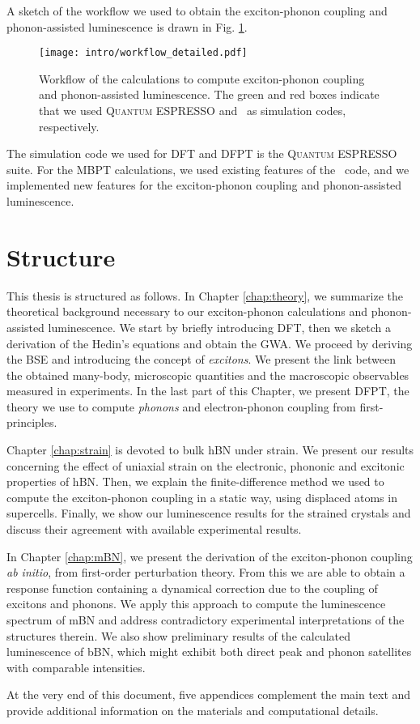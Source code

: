 A sketch of the workflow we used to obtain the exciton-phonon coupling and phonon-assisted luminescence is drawn in Fig. \ref{fig:workflow}.
\begin{figure}[t]
	\vspace{0.2cm}
	\setcapindent{2em}
	\centering
	\texttt{[image: intro/workflow\_detailed.pdf]}
	\caption{Workflow of the calculations to compute exciton-phonon coupling and phonon-assisted luminescence. The green and red boxes indicate that we used \textsc{Quantum ESPRESSO} and \yambo~as simulation codes, respectively.}
	\label{fig:workflow}
\end{figure}
The simulation code we used for \acrshort{DFT} and \acrshort{DFPT} is the \textsc{Quantum ESPRESSO} suite.\cite{giannozzi2009quantum,giannozzi2017advanced} For the \acrshort{MBPT} calculations, we used existing features of the \yambo~code,\cite{Sangalli_2019} and we implemented new features for the exciton-phonon coupling and phonon-assisted luminescence.

\section*{Structure}
This thesis is structured as follows. In Chapter \ref{chap:theory}, we summarize the theoretical background necessary to our exciton-phonon calculations and phonon-assisted luminescence. We start by briefly introducing \acrshort{DFT}, then we sketch a derivation of the Hedin's equations and obtain the \acrfull{GWA}. We proceed by deriving the \acrfull{BSE} and introducing the concept of \textit{excitons}. We present the link between the obtained many-body, microscopic quantities and the macroscopic observables measured in experiments. In the last part of this Chapter, we present \acrshort{DFPT}, the theory we use to compute \textit{phonons} and electron-phonon coupling from first-principles.

Chapter \ref{chap:strain} is devoted to bulk \acrshort{hBN} under strain. We present our results concerning the effect of uniaxial strain on the electronic, phononic and excitonic properties of \acrshort{hBN}. Then, we explain the finite-difference method we used to compute the exciton-phonon coupling in a static way, using displaced atoms in supercells. Finally, we show our luminescence results for the strained crystals and discuss their agreement with available experimental results.

In Chapter \ref{chap:mBN}, we present the derivation of the exciton-phonon coupling \textit{ab initio}, from first-order perturbation theory. From this we are able to obtain a response function containing a dynamical correction due to the coupling of excitons and phonons. We apply this approach to compute the luminescence spectrum of \acrfull{mBN} and address contradictory experimental interpretations of the structures therein. We also show preliminary results of the calculated luminescence of \acrfull{bBN}, which might exhibit both direct peak and phonon satellites with comparable intensities.
 
At the very end of this document, five appendices complement the main text and provide additional information on the materials and computational details.